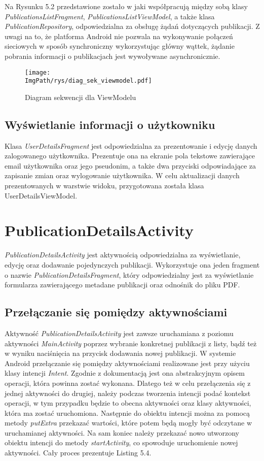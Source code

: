 \documentclass[a4paper,12pt,twoside,openany]{report}
\newcommand{\ImgPath}{.}
\begin{document}
 
Na Rysunku 5.2 przedstawione zostało w jaki współpracują między sobą klasy \textit{PublicationsListFragment}, \textit{PublicationsListViewModel}, a także klasa \textit{PublicationRepository}, odpowiedzialna za obsługę żądań dotyczących publikacji. Z uwagi na to, że platforma Android nie pozwala na wykonywanie połączeń sieciowych w sposób synchroniczny wykorzystując główny wąttek, żądanie pobrania informacji o publikacjach jest wywoływane asynchronicznie.
\begin{figure}[!htbp]
	\begin{center}
		\centering
		\texttt{[image: \\ImgPath/rys/diag\_sek\_viewmodel.pdf]}
	\end{center}
	\caption{Diagram sekwencji dla ViewModelu}
	\label{diagramAktywnosciLoginActivity}
\end{figure}

\subsection{Wyświetlanie informacji o użytkowniku}
Klasa \textit{UserDetailsFragment} jest odpowiedzialna za prezentowanie i edycję danych zalogowanego użytkownika. Prezentuje ona na ekranie pola tekstowe zawierające email użytkownika oraz jego pseudonim, a także dwa przyciski odpowiadające za zapisanie zmian oraz wylogowanie użytkownika. W celu aktualizacji danych prezentowanych w warstwie widoku, przygotowana została klasa UserDetailsViewModel.

\section{PublicationDetailsActivity}
\textit{PublicationDetailsActivity} jest aktywnością odpowiedzialna za wyświetlanie, edycję oraz dodawanie pojedynczych publikacji. Wykorzystuje ona jeden fragment o nazwie \textit{PublicationDetailsFragment}, który odpowiedzialny jest za wyświetlanie formularza zawierającego metadane publikacji oraz odnośnik do pliku PDF. 

\subsection{Przełączanie się pomiędzy aktywnościami}
Aktywność \textit{PublicationDetailsActivity} jest zawsze uruchamiana z poziomu aktywności \textit{MainActivity} poprzez wybranie konkretnej publikacji z listy, bądź też w wyniku naciśnięcia na przycisk dodawania nowej publikacji. W systemie Android przełączanie się pomiędzy aktywnościami realizowane jest przy użyciu klasy intencji \textit{Intent}. Zgodnie z dokumentacją \cite{INTENT} jest ona abstrakcyjnym opisem operacji, która powinna zostać wykonana. Dlatego też w celu przełączenia się z jednej aktywności do drugiej, należy podczas tworzenia intencji podać kontekst operacji, w tym przypadku będzie to obecna aktywności oraz klasy aktywności, która ma zostać uruchomiona. Następnie do obiektu intencji można za pomocą metody \textit{putExtra} przekazać wartości, które potem będą mogły być odczytane w uruchamianej aktywności. Na sam koniec należy przekazać nowo utworzony obiektu intencji do metody \textit{startActivity}, co spowoduje uruchomienie nowej aktywności. Cały proces prezentuje Listing 5.4.
\end{document}
